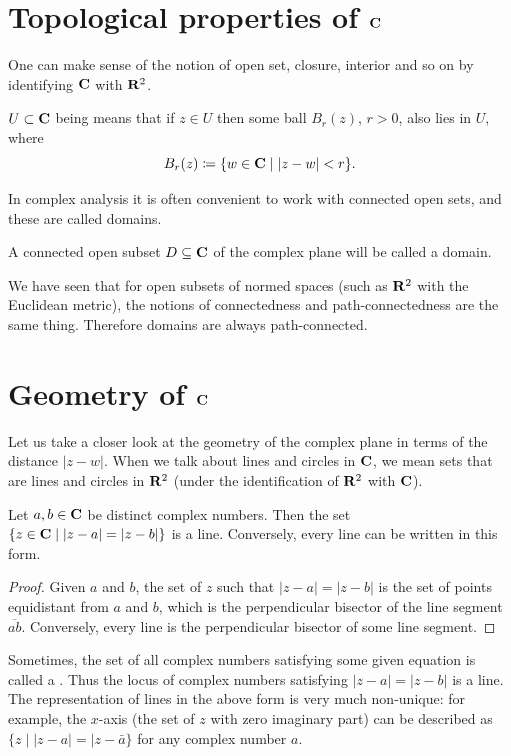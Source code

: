 \section{Topological properties of $\mathbf C$}
One can make sense of the notion of open set, closure, interior and so on by identifying $\mathbf C$ with $\mathbf R^2$.

\begin{definition}
$U\subset\mathbf C$ being  means that if $z\in U$ then some ball $B_r(z)$, $r>0$, also lies in $U$, where
\[B_r(z)\coloneqq\{w\in\mathbf C\mid|z-w|<r\}.\]
\end{definition}

In complex analysis it is often convenient to work with connected open sets, and these are called domains.

\begin{definition}
A connected open subset $D\subseteq\mathbf C$ of the complex plane will be called a domain.
\end{definition}

We have seen that for open subsets of normed spaces (such as $\mathbf R^2$ with the Euclidean metric), the notions of connectedness and path-connectedness are the same thing. Therefore domains are always path-connected.

\section{Geometry of $\mathbf C$}
Let us take a closer look at the geometry of the complex plane in terms of the distance $|z-w|$. When we talk about lines and circles in $\mathbf C$, we mean sets that are lines and circles in $\mathbf R^2$ (under the identification of $\mathbf R^2$ with $\mathbf C$).

\begin{lemma}[Lines]
Let $a,b\in\mathbf C$ be distinct complex numbers. Then the set $\{z\in\mathbf C\mid|z-a|=|z-b|\}$ is a line. Conversely, every line can be written in this form.
\end{lemma}

\begin{proof}
Given $a$ and $b$, the set of $z$ such that $|z-a|=|z-b|$ is the set of points equidistant from $a$ and $b$, which is the perpendicular bisector of the line segment $\overline{ab}$. Conversely, every line is the perpendicular bisector of some line segment.
\end{proof}

\begin{remark}
Sometimes, the set of all complex numbers satisfying some given equation is called a . Thus the locus of complex numbers satisfying $|z-a|=|z-b|$ is a line. The representation of lines in the above form is very much non-unique: for example, the $x$-axis (the set of $z$ with zero imaginary part) can be described as $\{z\mid|z-a|=|z-\bar{a}\}$ for any complex number $a$.
\end{remark}

